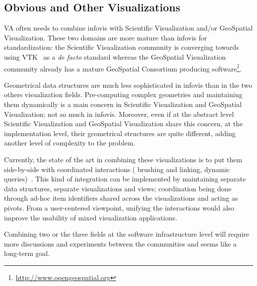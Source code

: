 \begin{comment}
 experiment on various means to carry this
community-driven consensus building, to see how it can help
consolidate acquired experience in the craft of toolkit design.


In many respects, this process is akin to a
standardization process, only it lacks the industry incentive and
backing. Like open source projects, we shall only count on voluntary
contributions (aside partial of funding from public research grants),
only, in the present state of toolkits, it is much more tempting to
devise and expand one's own toolkit than contribute and make
compromise to use a shared design which still lacks serious adoption.


As an afterthought, we find such consolidation effort is rarely found
in research domains, and yet should surely help make the field more
visible and readable from an outsider perspective.
\end{comment}

\subsection{Obvious and Other Visualizations}

VA often needs to combine infovis with Scientific
Visualization and/or GeoSpatial Visualization.  These two domains are
more mature than infovis for standardization: the Scientific
Visualization community is converging towards using VTK~\cite{VTK} as
a \textit{de facto} standard whereas the GeoSpatial Visualization
community already has a mature GeoSpatial Consortium producing
software\footnote{\url{http://www.opengeospatial.org}}.

Geometrical data structures are much less sophisticated in infovis
than in the two others visualization fields.  Pre-computing complex
geometries and maintaining them dynamically is a main concern in
Scientific Visualization and GeoSpatial Visualization; not so much in
infovis.  Moreover, even if at the abstract level Scientific
Visualization and GeoSpatial Visualization share this concern, at the
implementation level, their geometrical structures are quite
different, adding another level of complexity to the problem.

Currently, the state of the art in combining these visualizations is
to put them side-by-side with coordinated interactions ( brushing and
linking, dynamic queries)~\cite{Coord3D}.  This kind of integration 
can be implemented by maintaining separate data structures, separate
visualizations and views; coordination being done through ad-hoc item
identifiers shared across the visualizations and acting as pivots.
From a user-centered viewpoint, unifying the interactions would also
improve the usability of mixed visualization applications.

Combining two or the three fields at the software infrastructure
level will require more discussions and experiments between the
communities and seems like a long-term goal.
